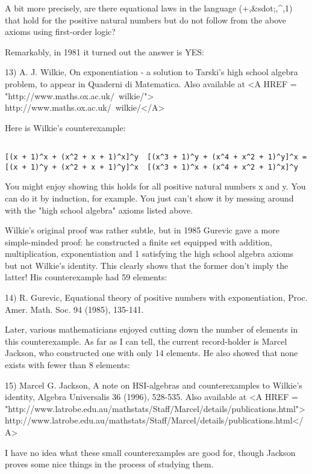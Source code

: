 A bit more precisely, are there equational laws in the language (+,&sdot;,^,1)
that hold for the positive natural numbers but do not follow from the 
above axioms using first-order logic?  

Remarkably, in 1981 it turned out the answer is YES:
	    
13) A. J. Wilkie, On exponentiation - a solution to Tarski's 
high school algebra problem, to appear in Quaderni di 
Matematica.   Also available at <A HREF = "http://www.maths.ox.ac.uk/~wilkie/"> http://www.maths.ox.ac.uk/~wilkie/</A>

Here is Wilkie's counterexample:


\begin{verbatim}

[(x + 1)^x + (x^2 + x + 1)^x]^y  [(x^3 + 1)^y + (x^4 + x^2 + 1)^y]^x =
[(x + 1)^y + (x^2 + x + 1)^y]^x  [(x^3 + 1)^x + (x^4 + x^2 + 1)^x]^y 
\end{verbatim}
    
You might enjoy showing this holds for all positive natural numbers x
and y.  You can do it by induction, for example.  You just can't show it
by messing around with the "high school algebra" axioms listed above.

Wilkie's original proof was rather subtle, but in 1985 Gurevic gave a
more simple-minded proof: he constructed a finite set equipped with
addition, multiplication, exponentiation and 1 satisfying the high
school algebra axioms but not Wilkie's identity.  This clearly shows
that the former don't imply the latter!  His counterexample had 59
elements:

14) R. Gurevic, Equational theory of positive numbers with exponentiation,
Proc. Amer. Math. Soc. 94 (1985), 135-141.

Later, various mathematicians enjoyed cutting down the number of
elements in this counterexample.   As far as I can tell, the current
record-holder is Marcel Jackson, who constructed one with only 14
elements.  He also showed that none exists with fewer than 8 elements:

15) Marcel G. Jackson, A note on HSI-algebras and counterexamples to 
Wilkie's identity, Algebra Universalis 36 (1996), 528-535.  Also available at 
<A HREF = "http://www.latrobe.edu.au/mathstats/Staff/Marcel/details/publications.html">http://www.latrobe.edu.au/mathstats/Staff/Marcel/details/publications.html</A>

I have no idea what these small counterexamples are good for, though
Jackson proves some nice things in the process of studying them.  

